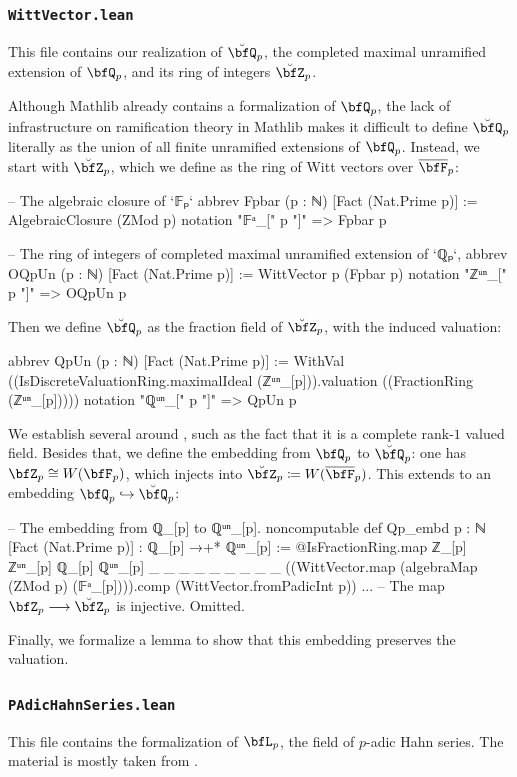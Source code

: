 \documentclass[english,oneside]{smfart}
\newcommand{\lto}{\longrightarrow}
\begin{document}
\subsubsection{\texttt{WittVector.lean}}
This file contains our realization of $\breve{\bfQ}_p$, the completed maximal unramified extension of $\bfQ_p$, and its ring of integers $\breve{\bfZ}_p$.

Although Mathlib already contains a formalization of $\bfQ_p$, the lack of infrastructure on ramification theory in Mathlib makes it difficult to define $\breve{\bfQ}_p$ literally as the union of all finite unramified extensions of $\bfQ_p$. Instead, we start with $\breve{\bfZ}_p$, which we define as the ring of Witt vectors over $\overline{\bfF}_p$:
\begin{leancode}
-- The algebraic closure of `𝔽ₚ`
abbrev Fpbar (p : ℕ) [Fact (Nat.Prime p)] := AlgebraicClosure (ZMod p)
notation "𝔽ᵃ_[" p "]" => Fpbar p

-- The ring of integers of completed maximal unramified extension of `ℚₚ`,
abbrev OQpUn (p : ℕ) [Fact (Nat.Prime p)] := WittVector p (Fpbar p)
notation "ℤᵘⁿ_[" p "]" => OQpUn p
\end{leancode}
Then we define $\breve{\bfQ}_p$ as the fraction field of $\breve{\bfZ}_p$, with the induced valuation:
\begin{leancode}
abbrev QpUn (p : ℕ) [Fact (Nat.Prime p)] :=
  WithVal ((IsDiscreteValuationRing.maximalIdeal (ℤᵘⁿ_[p])).valuation 
    ((FractionRing (ℤᵘⁿ_[p]))))
notation "ℚᵘⁿ_[" p "]" => QpUn p
\end{leancode}

We establish several  around , such as the fact that it is a complete rank-$1$ valued field. Besides that, we define the embedding from $\bfQ_p$ to $\breve{\bfQ}_p$: one has $\bfZ_p\cong W(\bfF_p)$, which injects into $\breve{\bfZ}_p\coloneqq W(\overline{\bfF}_p)$. This extends to an embedding $\bfQ_p\hookrightarrow \breve{\bfQ}_p$:
\begin{leancode}
-- The embedding from ℚ_[p] to ℚᵘⁿ_[p].
noncomputable def Qp_embd {p : ℕ} [Fact (Nat.Prime p)] : ℚ_[p] →+* ℚᵘⁿ_[p] :=
  @IsFractionRing.map ℤ_[p] ℤᵘⁿ_[p] ℚ_[p] ℚᵘⁿ_[p] _ _ _ _ _ _ _ _ _
    ((WittVector.map (algebraMap (ZMod p) (𝔽ᵃ_[p]))).comp
      (WittVector.fromPadicInt p)) ... -- The map $\bfZ_p\lto\breve{\bfZ}_p$ is injective. Omitted.
\end{leancode}
Finally, we formalize a lemma to show that this embedding preserves the valuation.

\subsubsection{\texttt{PAdicHahnSeries.lean}}
This file contains the formalization of $\bfL_p$, the field of $p$-adic Hahn series. The material is mostly taken from \cite{poonenMAXIMALLYCOMPLETEFIELDS1993}.
\end{document}
